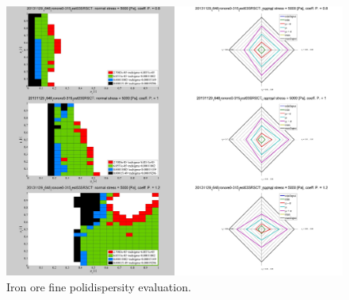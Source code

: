 \begin{figure}[!htb]
\centering
\includegraphics[width=.96\columnwidth]{images/082ironore0315}
\caption[Iron ore fine polidispersity evaluation]{Iron ore fine polidispersity evaluation.}
\label{fig:082ironore0315}
\end{figure}